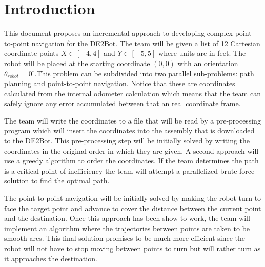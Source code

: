 \documentclass[12pt,conference,onecolumn]{article} %
\begin{document}
\section*{Introduction}
This document proposes an incremental approach to developing complex point-to-point navigation for the DE2Bot. The team will be given a list of 12 Cartesian coordinate points $X \in [-4,4]$ and $Y \in [-5,5]$ where units are in feet. The robot will be placed at the starting coordinate $(0,0)$ with an orientation $\theta_{robot} = 0^{\circ}$.This problem can be subdivided into two parallel sub-problems: path planning and point-to-point navigation. Notice that these are coordinates calculated from the internal odometer calculation which means that the team can safely ignore any error accumulated between that an real coordinate frame.\par
The team will write the coordinates to a file that will be read by a pre-processing program which will insert the coordinates into the assembly that is downloaded to the DE2Bot. This pre-processing step will be initially solved by writing the coordinates in the original order in which they are given. A second approach will use a greedy algorithm to order the coordinates. If the team determines the path is a critical point of inefficiency the team will attempt a parallelized brute-force solution to find the  optimal path.\par
The point-to-point navigation will be initially solved by making the robot turn to face the target point and advance to cover the distance between the current point and the destination. Once this approach has been show to work, the team will implement an algorithm where the trajectories between points are taken to be smooth arcs. This final solution promises to be much more efficient since the robot will not have to stop moving between points to turn but will rather turn as it approaches the destination.\par
\end{document}
